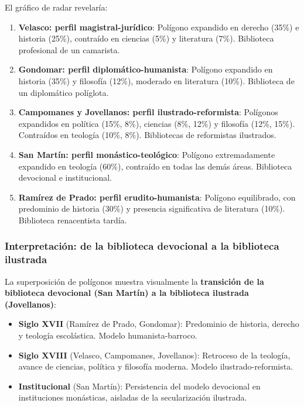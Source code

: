 \documentclass[11pt,a4paper]{article}
\begin{document}
El gráfico de radar revelaría:

\begin{enumerate}
\item \textbf{Velasco: perfil magistral-jurídico}: Polígono expandido en derecho (35\%) e historia (25\%), contraído en ciencias (5\%) y literatura (7\%). Biblioteca profesional de un camarista.

\item \textbf{Gondomar: perfil diplomático-humanista}: Polígono expandido en historia (35\%) y filosofía (12\%), moderado en literatura (10\%). Biblioteca de un diplomático políglota.

\item \textbf{Campomanes y Jovellanos: perfil ilustrado-reformista}: Polígonos expandidos en política (15\%, 8\%), ciencias (8\%, 12\%) y filosofía (12\%, 15\%). Contraídos en teología (10\%, 8\%). Bibliotecas de reformistas ilustrados.

\item \textbf{San Martín: perfil monástico-teológico}: Polígono extremadamente expandido en teología (60\%), contraído en todas las demás áreas. Biblioteca devocional e institucional.

\item \textbf{Ramírez de Prado: perfil erudito-humanista}: Polígono equilibrado, con predominio de historia (30\%) y presencia significativa de literatura (10\%). Biblioteca renacentista tardía.
\end{enumerate}

\subsubsection{Interpretación: de la biblioteca devocional a la biblioteca ilustrada}

La superposición de polígonos muestra visualmente la \textbf{transición de la biblioteca devocional (San Martín) a la biblioteca ilustrada (Jovellanos)}:

\begin{itemize}
\item \textbf{Siglo XVII} (Ramírez de Prado, Gondomar): Predominio de historia, derecho y teología escolástica. Modelo humanista-barroco.
\item \textbf{Siglo XVIII} (Velasco, Campomanes, Jovellanos): Retroceso de la teología, avance de ciencias, política y filosofía moderna. Modelo ilustrado-reformista.
\item \textbf{Institucional} (San Martín): Persistencia del modelo devocional en instituciones monásticas, aisladas de la secularización ilustrada.
\end{itemize}
\end{document}
